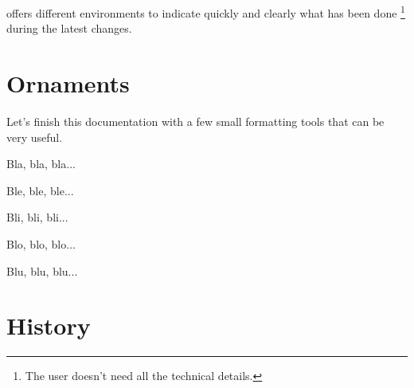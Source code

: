  offers different environments to indicate quickly and clearly what has been done
\footnote{
    The user doesn't need all the technical details.
}
during the latest changes.


\begin{tdocexa}
    \leavevmode

\end{tdocexa}




\begin{tdocexa}
    \leavevmode

\end{tdocexa}




\begin{tdocexa}
    \leavevmode

\end{tdocexa}




\begin{tdocexa}
    \leavevmode

\end{tdocexa}

\section{Ornaments}

Let's finish this documentation with a few small formatting tools that can be very useful.


\begin{tdoclatex}[sbs]
Bla, bla, bla...

\tdocsep %

Ble, ble, ble...

Bli, bli, bli...

\tdocxspace %

Blo, blo, blo...

Blu, blu, blu...

\end{tdoclatex}



\newpage
\section{History}


